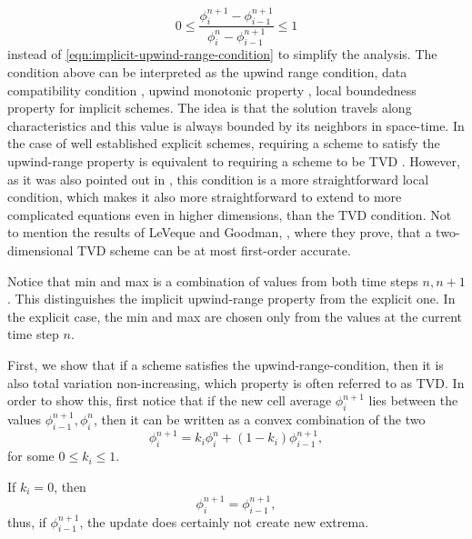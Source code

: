 \documentclass[../thesis.tex]{subfiles}
\begin{document}
\begin{equation}\label{eqn:upwind-range-simpler}
    0
    \leq
    \frac{\phi_{i}^{n+1} - \phi_{i-1}^{n+1}}{\phi_{i}^{n} - \phi_{i-1}^{n+1}}
    \leq
    1
\end{equation}
instead of \eqref{eqn:implicit-upwind-range-condition} to simplify the analysis.
The condition above can be interpreted as the upwind range condition\cite{1998_Laney_BOOK},
data compatibility condition \cite{2009_Toro_BOOK}, upwind monotonic property \cite{1989_Huynh_CONF}, local boundedness property \cite{1982_Roe,1997_Thuburn} for implicit schemes.
The idea is that the solution travels along characteristics and this value is always bounded by its neighbors in space-time. In the case of well established explicit schemes, requiring a scheme to satisfy the upwind-range property is equivalent to requiring a scheme to be TVD \cite{1997_Thuburn}. However, as it was also pointed out in \cite{1997_Thuburn}, this condition is a more straightforward local condition, which makes it also more straightforward to extend to more complicated equations even in higher dimensions, than the TVD condition. Not to mention the results of LeVeque and Goodman, \cite{1985_LeVeque_CONF}, where they prove, that a two-dimensional TVD scheme can be at most first-order accurate.

Notice that min and max is a combination of values from both time steps \(n, n+1\).
This distinguishes the implicit upwind-range property from the explicit one.
In the explicit case, the min and max are chosen only from the values at the current time step \(n\).

First, we show that if a scheme satisfies the upwind-range-condition, then it is also total variation non-increasing, which property is often referred to as TVD.
In order to show this, first notice that if the new cell average \(\phi_{i}^{n+1}\) lies
between the values \(\phi_{i-1}^{n+1}, \phi_{i}^{n}\), then it can be written as a convex combination of the two
\begin{equation}\label{eqn:convex-combination}
    \phi_{i}^{n+1} =
    k_{i}\phi_{i}^{n} + (1-k_{i})\phi_{i-1}^{n+1},
\end{equation}
for some \(0 \leq k_{i} \leq 1\).

If \(k_{i} = 0\), then
\[
    \phi_{i}^{n+1} = \phi_{i-1}^{n+1},
\]
thus, if \(\phi_{i-1}^{n+1}\), the update does certainly not create new extrema.
\end{document}
